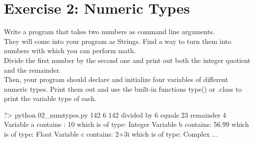 \documentclass{42-en}
\begin{document}
\chapter{Exercise 2: Numeric Types}
\makeheaderfiles

Write a program that takes two numbers as command line arguments.\\

They will come into your program as Strings. Find a way to turn them into numbers with which you can perform math.\\

Divide the first number by the second one and print out both the integer quotient and the remainder.\\

Then, your program should declare and initialize four variables of different numeric types.
Print them out and use the built-in functions type() or .class to print the variable type of each.

\begin{42console}
	?> python 02\_numtypes.py 142 6
	142 divided by 6 equals 23 remainder 4
	Variable a contains : 10  which is of type: Integer
	Variable b contains: 56.99  which is of type: Float
	Variable c contains: 2+3i  which is of type: Complex
	...
\end{42console}


\nextexercice
\newpage




\end{document}
